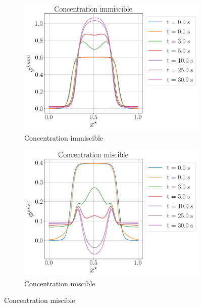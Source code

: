 \begin{figure}[H]
	\centering \hspace{-2cm}
	\begin{subfigure}[H]{0.45\textwidth}
		\centering
		\includegraphics[width=1.1\textwidth]{figure/nouveau_parametrage/immiscible_New_Parametrage.png}
		\caption{Concentration immiscible}
		\label{fig:y equals x}
	\end{subfigure} \hfil
	\begin{subfigure}[H]{0.45\textwidth}
		\centering
		\includegraphics[width=1.1\textwidth]{figure/nouveau_parametrage/miscible_New_Parametrage.png}
		\caption{Concentration miscible}
		\label{fig:y equals x}
	\end{subfigure}
\end{figure} \vspace{-0.8cm}
